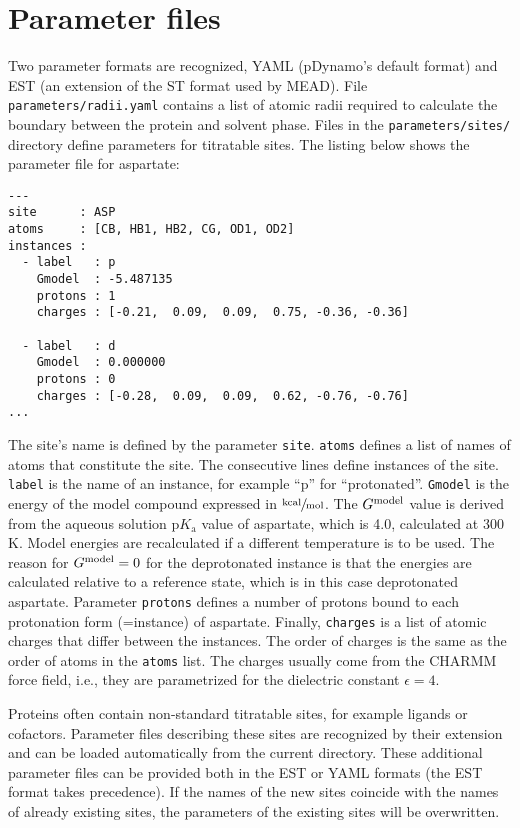 \documentclass[12pt]{article}
\newcommand{\pka}{$\mathrm{p}K_{\mathrm{a}}$\xspace}
\newcommand{\kcal}{$\sfrac{\rm kcal}{\rm mol}$\xspace}
\begin{document}
{\section{Parameter files}
Two parameter formats are recognized,
YAML (pDynamo's default format) and
EST (an extension of the ST format used by MEAD).
%
File {\tt parameters/radii.yaml} contains a list of atomic radii
required to calculate the boundary between the protein and
solvent phase.
%
Files in the {\tt parameters/sites/} directory define parameters
for titratable sites.
%
The listing below shows the parameter file for aspartate:

\newpage
{\footnotesize \singlespacing \begin{lstlisting}
---
site      : ASP
atoms     : [CB, HB1, HB2, CG, OD1, OD2]
instances :
  - label   : p
    Gmodel  : -5.487135
    protons : 1
    charges : [-0.21,  0.09,  0.09,  0.75, -0.36, -0.36]

  - label   : d
    Gmodel  : 0.000000
    protons : 0
    charges : [-0.28,  0.09,  0.09,  0.62, -0.76, -0.76]
...
\end{lstlisting} }


\bigskip
The site's name is defined by the parameter \texttt{site}.
%
\texttt{atoms} defines a list of names of atoms that constitute the site.
%
The consecutive lines define instances of the site.
%
\texttt{label} is the name of an instance, for example ``p'' for ``protonated''.
%
\texttt{Gmodel} is the energy of the model compound expressed in \kcal.
%
The $G^{\rm model}$ value is derived from the aqueous solution \pka value
of aspartate,
which is 4.0,
calculated at 300 K.
%
Model energies are recalculated if a different temperature is
to be used.
%
The reason for $G^{\rm model}=0$ for the deprotonated instance is that
the energies are calculated relative to a reference state,
which is in this case deprotonated aspartate.
%
Parameter {\tt protons} defines a number of protons bound to
each protonation form (=instance) of aspartate.
%
Finally,
{\tt charges} is a list of atomic charges that differ between
the instances.
%
The order of charges is the same as the order of atoms in
the {\tt atoms} list.
%
The charges usually come from the CHARMM force field,
i.e.,
they are parametrized for the dielectric constant $\epsilon=4$.

Proteins often contain non-standard titratable sites,
for example ligands or cofactors.
%
Parameter files describing these sites are recognized by their extension
and can be loaded automatically from the current directory.
%
These additional parameter files can be provided both in the EST or YAML formats
(the EST format takes precedence).
%
If the names of the new sites coincide with the names of already existing sites,
the parameters of the existing sites will be overwritten.


}
\end{document}
